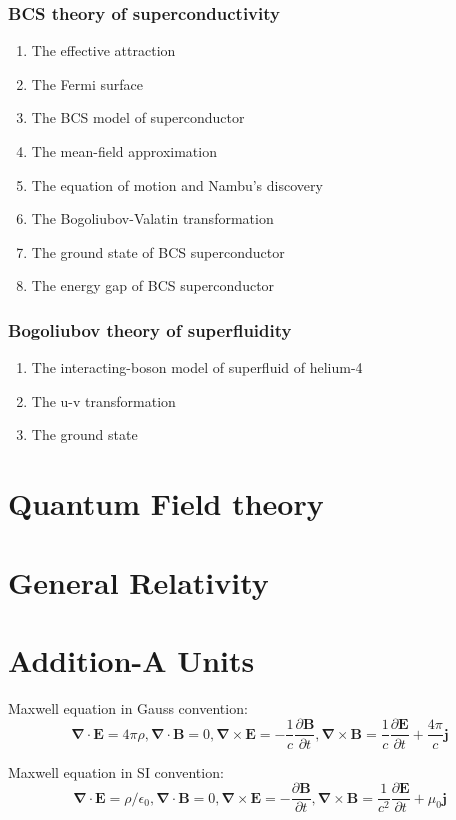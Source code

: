 \documentclass[12pt]{article}
\numberwithin{equation}{section}
\begin{document}
\subsubsection{BCS theory of superconductivity}
\begin{enumerate}
\item The effective attraction
\item The Fermi surface
\item The BCS model of  superconductor
\item The mean-field approximation
\item The equation of motion and Nambu's discovery
\item The Bogoliubov-Valatin transformation
\item The ground state of BCS superconductor
\item The energy gap of BCS superconductor
\end{enumerate}
\subsubsection{Bogoliubov theory of superfluidity}
\begin{enumerate}
\item The interacting-boson model of superfluid of helium-4
\item The u-v transformation
\item The ground state
\end{enumerate}                     
\section{Quantum Field theory}

\section{General Relativity}

\section{Addition-A Units}
	Maxwell equation in Gauss convention:
	\begin{equation}
		\bm{\nabla}\cdot\bm{E}=4\pi \rho,\bm{\nabla}\cdot\bm{B}=0,	
		\bm{\nabla}\times\bm{E}=-\frac{1}{c}\frac{\partial\bm{B}}{\partial t},
		\bm{\nabla}\times\bm{B}=\frac{1}{c}\frac{\partial\bm{E}}{\partial t}+\frac{4\pi}{c} \bm{j}
	\end{equation} \par
	Maxwell equation in SI convention:
	\begin{equation}
		\bm{\nabla}\cdot\bm{E}=\rho/\epsilon_0,\bm{\nabla}\cdot\bm{B}=0,	
		\bm{\nabla}\times\bm{E}=-\frac{\partial\bm{B}}{\partial t},
		\bm{\nabla}\times\bm{B}=\frac{1}{c^2}\frac{\partial\bm{E}}{\partial t}+\mu_0 \bm{j}
	\end{equation}
\renewcommand\refname{Reference}

 
\clearpage
\end{document}
